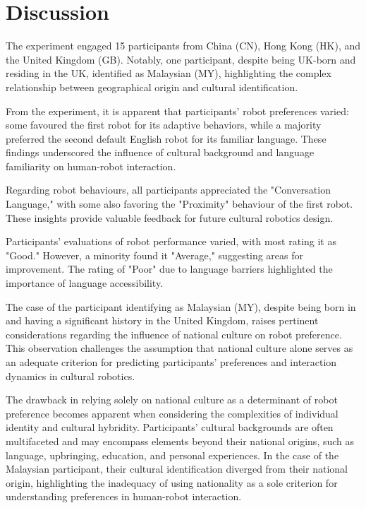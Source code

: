 
\chapter{Discussion}

The experiment engaged 15 participants from China (CN), Hong Kong (HK), and the United Kingdom (GB). Notably, one participant, despite being UK-born and residing in the UK, identified as Malaysian (MY), highlighting the complex relationship between geographical origin and cultural identification.

From the experiment, it is apparent that participants' robot preferences varied: some favoured the first robot for its adaptive behaviors, while a majority preferred the second default English robot for its familiar language. These findings underscored the influence of cultural background and language familiarity on human-robot interaction.

Regarding robot behaviours, all participants appreciated the "Conversation Language," with some also favoring the "Proximity" behaviour of the first robot. These insights provide valuable feedback for future cultural robotics design.

Participants' evaluations of robot performance varied, with most rating it as "Good." However, a minority found it "Average," suggesting areas for improvement. The rating of "Poor" due to language barriers highlighted the importance of language accessibility.

The case of the participant identifying as Malaysian (MY), despite being born in and having a significant history in the United Kingdom, raises pertinent considerations regarding the influence of national culture on robot preference. This observation challenges the assumption that national culture alone serves as an adequate criterion for predicting participants' preferences and interaction dynamics in cultural robotics.

The drawback in relying solely on national culture as a determinant of robot preference becomes apparent when considering the complexities of individual identity and cultural hybridity. Participants' cultural backgrounds are often multifaceted and may encompass elements beyond their national origins, such as language, upbringing, education, and personal experiences. In the case of the Malaysian participant, their cultural identification diverged from their national origin, highlighting the inadequacy of using nationality as a sole criterion for understanding preferences in human-robot interaction.


